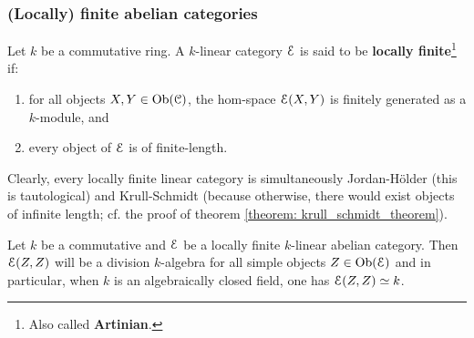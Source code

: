         \subsubsection{(Locally) finite abelian categories}
            \begin{definition} \label{def: locally_finite_linear_categories}
                Let $k$ be a commutative ring. A $k$-linear category $\mathcal{E}$ is said to be \textbf{locally finite}\footnote{Also called \textbf{Artinian}.} if:
                    \begin{enumerate}
                        \item for all objects $X, Y \in \mathrm{Ob}(\mathcal{C})$, the hom-space $\mathcal{E}(X, Y)$ is finitely generated as a $k$-module, and
                        \item every object of $\mathcal{E}$ is of finite-length.
                    \end{enumerate}
            \end{definition}
            \begin{remark}
                Clearly, every locally finite linear category is simultaneously Jordan-H\"older (this is tautological) and Krull-Schmidt (because otherwise, there would exist objects of infinite length; cf. the proof of theorem \ref{theorem: krull_schmidt_theorem}).
            \end{remark}
            \begin{proposition} \label{prop: endomorphism_algebras_of_simple_objects_in_locally_finite_linear_categories}
                Let $k$ be a commutative and $\mathcal{E}$ be a locally finite $k$-linear abelian category. Then $\mathcal{E}(Z, Z)$ will be a division $k$-algebra for all simple objects $Z \in \mathrm{Ob}(\mathcal{E})$ and in particular, when $k$ is an algebraically closed field, one has $\mathcal{E}(Z, Z) \simeq k$.
            \end{proposition}
